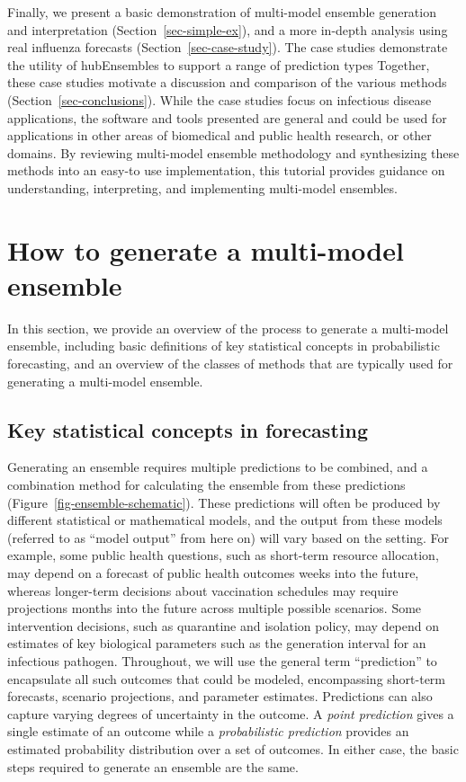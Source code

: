 \documentclass[
]{article}
\begin{document}
Finally, we present a basic demonstration of multi-model ensemble
generation and interpretation (Section~\ref{sec-simple-ex}), and a more
in-depth analysis using real influenza forecasts
(Section~\ref{sec-case-study}). The case studies demonstrate the utility
of hubEnsembles to support a range of prediction types Together, these
case studies motivate a discussion and comparison of the various methods
(Section~\ref{sec-conclusions}). While the case studies focus on
infectious disease applications, the software and tools presented are
general and could be used for applications in other areas of biomedical
and public health research, or other domains. By reviewing multi-model
ensemble methodology and synthesizing these methods into an easy-to use
implementation, this tutorial provides guidance on understanding,
interpreting, and implementing multi-model ensembles.

\section{How to generate a multi-model ensemble}\label{sec-defs}

In this section, we provide an overview of the process to generate a
multi-model ensemble, including basic definitions of key statistical
concepts in probabilistic forecasting, and an overview of the classes of
methods that are typically used for generating a multi-model ensemble.

\subsection{Key statistical concepts in
forecasting}\label{key-statistical-concepts-in-forecasting}

Generating an ensemble requires multiple predictions to be combined, and
a combination method for calculating the ensemble from these predictions
(Figure~\ref{fig-ensemble-schematic}). These predictions will often be
produced by different statistical or mathematical models, and the output
from these models (referred to as ``model output'' from here on) will
vary based on the setting. For example, some public health questions,
such as short-term resource allocation, may depend on a forecast of
public health outcomes weeks into the future, whereas longer-term
decisions about vaccination schedules may require projections months
into the future across multiple possible scenarios. Some intervention
decisions, such as quarantine and isolation policy, may depend on
estimates of key biological parameters such as the generation interval
for an infectious pathogen. Throughout, we will use the general term
``prediction'' to encapsulate all such outcomes that could be modeled,
encompassing short-term forecasts, scenario projections, and parameter
estimates. Predictions can also capture varying degrees of uncertainty
in the outcome. A \emph{point prediction} gives a single estimate of an
outcome while a \emph{probabilistic prediction} provides an estimated
probability distribution over a set of outcomes. In either case, the
basic steps required to generate an ensemble are the same.
\end{document}
